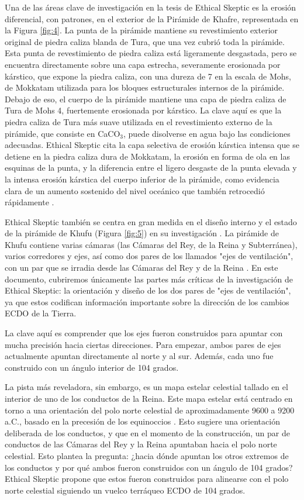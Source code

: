 \documentclass[10pt,twocolumn,letterpaper]{article}
\begin{document}
Una de las áreas clave de investigación en la tesis de Ethical Skeptic es la erosión diferencial, con patrones, en el exterior de la Pirámide de Khafre, representada en la Figura \ref{fig:4}. La punta de la pirámide mantiene su revestimiento exterior original de piedra caliza blanda de Tura, que una vez cubrió toda la pirámide. Esta punta de revestimiento de piedra caliza está ligeramente desgastada, pero se encuentra directamente sobre una capa estrecha, severamente erosionada por kárstico, que expone la piedra caliza, con una dureza de 7 en la escala de Mohs, de Mokkatam utilizada para los bloques estructurales internos de la pirámide. Debajo de eso, el cuerpo de la pirámide mantiene una capa de piedra caliza de Tura de Mohs 4, fuertemente erosionada por kárstico. La clave aquí es que la piedra caliza de Tura más suave utilizada en el revestimiento externo de la pirámide, que consiste en CaCO$_3$, puede disolverse en agua bajo las condiciones adecuadas. Ethical Skeptic cita la capa selectiva de erosión kárstica intensa que se detiene en la piedra caliza dura de Mokkatam, la erosión en forma de ola en las esquinas de la punta, y la diferencia entre el ligero desgaste de la punta elevada y la intensa erosión kárstica del cuerpo inferior de la pirámide, como evidencia clara de un aumento sostenido del nivel oceánico que también retrocedió rápidamente \cite{27}.

Ethical Skeptic también se centra en gran medida en el diseño interno y el estado de la pirámide de Khufu (Figura \ref{fig:5}) en su investigación \cite{28}. La pirámide de Khufu contiene varias cámaras (las Cámaras del Rey, de la Reina y Subterránea), varios corredores y ejes, así como dos pares de los llamados "ejes de ventilación", con un par que se irradia desde las Cámaras del Rey y de la Reina \cite{29,30}. En este documento, cubriremos únicamente las partes más críticas de la investigación de Ethical Skeptic: la orientación y diseño de los dos pares de "ejes de ventilación", ya que estos codifican información importante sobre la dirección de los cambios ECDO de la Tierra.

La clave aquí es comprender que los ejes fueron construidos para apuntar con mucha precisión hacia ciertas direcciones. Para empezar, ambos pares de ejes actualmente apuntan directamente al norte y al sur. Además, cada uno fue construido con un ángulo interior de 104 grados.

La pista más reveladora, sin embargo, es un mapa estelar celestial tallado en el interior de uno de los conductos de la Reina. Este mapa estelar está centrado en torno a una orientación del polo norte celestial de aproximadamente 9600 a 9200 a.C., basado en la precesión de los equinoccios \cite{28}. Esto sugiere una orientación deliberada de los conductos, y que en el momento de la construcción, un par de conductos de las Cámaras del Rey y la Reina apuntaban hacia el polo norte celestial. Esto plantea la pregunta: ¿hacia dónde apuntan los otros extremos de los conductos y por qué ambos fueron construidos con un ángulo de 104 grados? Ethical Skeptic propone que estos fueron construidos para alinearse con el polo norte celestial siguiendo un vuelco terráqueo ECDO de 104 grados.
\end{document}
